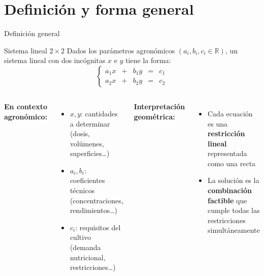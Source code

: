 \documentclass[11pt, aspectratio=169]{beamer}
\newcommand{\R}{\mathbb{R}}
\begin{document}
\section{Definición y forma general}

\begin{frame}{Definición general}
  \begin{block}{Sistema lineal $2\times2$}
    Dados los parámetros agronómicos $(a_i, b_i, c_i \in \R)$,
    un sistema lineal con dos incógnitas $x$ e $y$ tiene la forma:
    \[
      \left\{
      \begin{array}{rcrcr}
        a_1 x & + & b_1 y & = & c_1 \\[6pt]
        a_2 x & + & b_2 y & = & c_2
      \end{array}
      \right.
    \]
  \end{block}

  \vspace{0.3em}
  \begin{columns}[T]
      \textbf{En contexto agronómico:}
      \begin{itemize}
        \item $x, y$: cantidades a determinar\\
          (dosis, volúmenes, superficies\ldots)
        \item $a_i, b_i$: coeficientes técnicos\\
          (concentraciones, rendimientos\ldots)
        \item $c_i$: requisitos del cultivo\\
          (demanda nutricional, restricciones\ldots)
      \end{itemize}
      \textbf{Interpretación geométrica:}
      \begin{itemize}
        \item Cada ecuación es una \textbf{restricción lineal}
          representada como una recta
        \item La solución es la \textbf{combinación factible}
          que cumple todas las restricciones simultáneamente
      \end{itemize}
  \end{columns}
\end{frame}
\end{document}
